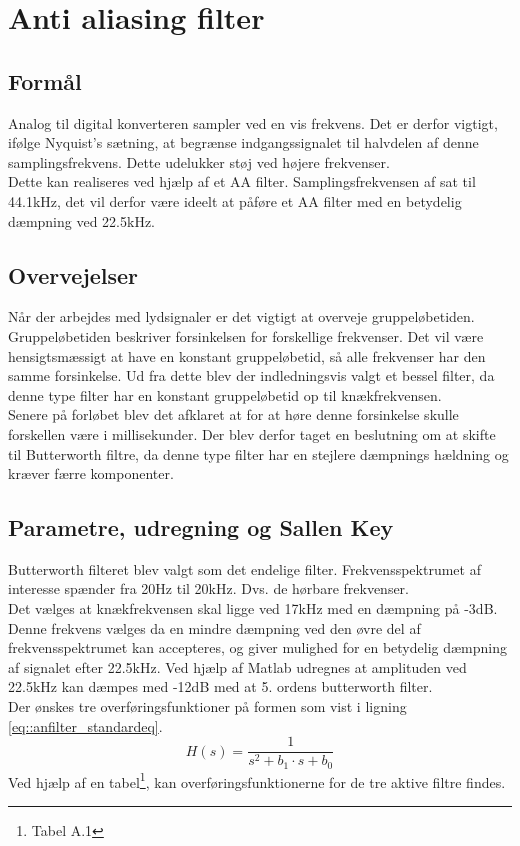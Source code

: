 
\section{Anti aliasing filter}
\subsection{Formål}
Analog til digital konverteren sampler ved en vis frekvens. Det er derfor vigtigt, ifølge Nyquist’s sætning, at begrænse indgangssignalet til halvdelen af denne samplingsfrekvens. Dette udelukker støj ved højere frekvenser.\\

Dette kan realiseres ved hjælp af et AA filter. Samplingsfrekvensen af sat til 44.1kHz, det vil derfor være ideelt at påføre et AA filter med en betydelig dæmpning ved 22.5kHz.\\
\subsection{Overvejelser}
Når der arbejdes med lydsignaler er det vigtigt at overveje gruppeløbetiden. Gruppeløbetiden beskriver forsinkelsen for forskellige frekvenser. Det vil være hensigtsmæssigt at have en konstant gruppeløbetid, så alle frekvenser har den samme forsinkelse. Ud fra dette blev der indledningsvis valgt et bessel filter, da denne type filter har en konstant gruppeløbetid op til knækfrekvensen. \\
Senere på forløbet blev det afklaret at for at høre denne forsinkelse skulle forskellen være i millisekunder. Der blev derfor taget en beslutning om at skifte til Butterworth filtre, da denne type filter har en stejlere dæmpnings hældning og kræver færre komponenter.
\subsection{Parametre, udregning og Sallen Key}\label{sec::anfilter_sallenpara}
Butterworth filteret blev valgt som det endelige filter. Frekvensspektrumet af interesse spænder fra 20Hz til 20kHz. Dvs. de hørbare frekvenser.\\
Det vælges at knækfrekvensen skal ligge ved 17kHz med en dæmpning på -3dB. Denne frekvens vælges da en mindre dæmpning ved den øvre del af frekvensspektrumet kan accepteres, og giver mulighed for en betydelig dæmpning af signalet efter 22.5kHz. Ved hjælp af Matlab udregnes at amplituden ved 22.5kHz kan dæmpes med -12dB med at 5. ordens butterworth filter.\\
Der ønskes tre overføringsfunktioner på formen som vist i ligning \ref{eq::anfilter_standardeq}.
\begin{equation}
	H(s) = \dfrac{1}{s^2+b_1\cdot s + b_0}\label{eq::anfilter_standardeq}
\end{equation}
Ved hjælp af en tabel\footnote{Tabel A.1\cite[s. 377]{Su2002}}, kan overføringsfunktionerne for de tre aktive filtre findes.

